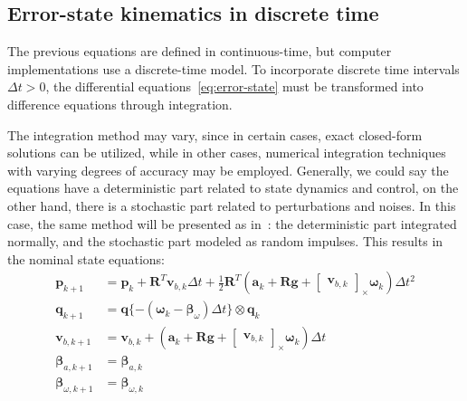 \subsection{Error-state kinematics in discrete time}

The previous equations are defined in continuous-time, but computer implementations use a discrete-time model. To incorporate discrete time intervals $\Delta t>0$, the differential equations~\eqref{eq:error-state} must be transformed into difference equations through integration. 

The integration method may vary, since in certain cases, exact closed-form solutions can be utilized, while in other cases, numerical integration techniques with varying degrees of accuracy may be employed. Generally, we could say the equations have a deterministic part related to state dynamics and control, on the other hand, there is a stochastic part related to perturbations and noises. In this case, the same method will be presented as in~\cite{quaternion-eskf}: the deterministic part integrated normally, and the stochastic part modeled as random impulses. This results in the nominal state equations:
\begin{subequations}
\begin{align}
    \mathbf{p}_{k+1}&=\mathbf{p}_{k}+\mathbf{R}^T\mathbf{v}_{b,k}\Delta t + 
    \frac{1}{2}\mathbf{R}^T\left(\mathbf{a}_k+\mathbf{R}\mathbf{g} + \begin{bmatrix}\mathbf{v}_{b,k}\end{bmatrix}_{\times}\boldsymbol{\omega}_k\right)\Delta t^2   \\
    \mathbf{q}_{k+1}&=\mathbf{q}\{-(\boldsymbol{\omega}_k-\boldsymbol{\beta}_\omega)\Delta t\} \otimes \mathbf{q}_{k} \\
    \mathbf{v}_{b,k+1}&=\mathbf{v}_{b,k}+\left(\mathbf{a}_k+\mathbf{R}\mathbf{g} +\begin{bmatrix}\mathbf{v}_{b,k}\end{bmatrix}_{\times}\boldsymbol{\omega}_k\right)\Delta t \\
    \boldsymbol{\beta}_{a,k+1}&=\boldsymbol{\beta}_{a,k} \\
    \boldsymbol{\beta}_{\omega, k+1}&=\boldsymbol{\beta}_{\omega,k}
\end{align}\label{eq:nom-eq-discrete}
\end{subequations}

